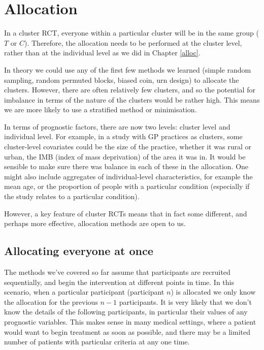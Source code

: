\documentclass[
  openany]{book}
\theoremstyle{definition}
\theoremstyle{definition}
\theoremstyle{definition}
\theoremstyle{definition}
\theoremstyle{remark}
\begin{document}
\hypertarget{allocation}{%
\section{Allocation}\label{allocation}}

In a cluster RCT, everyone within a particular cluster will be in the same group (\(T\) or \(C\)). Therefore, the allocation needs to be performed at the cluster level, rather than at the individual level as we did in Chapter \ref{alloc}.

In theory we could use any of the first few methods we learned (simple random sampling, random permuted blocks, biased coin, urn design) to allocate the clusters. However, there are often relatively few clusters, and so the potential for imbalance in terms of the nature of the clusters would be rather high. This means we are more likely to use a stratified method or minimisation.

In terms of prognostic factors, there are now two levels: cluster level and individual level. For example, in a study with GP practices as clusters, some cluster-level covariates could be the size of the practice, whether it was rural or urban, the IMB (index of mass deprivation) of the area it was in. It would be sensible to make sure there was balance in each of these in the allocation. One might also include aggregates of individual-level characteristics, for example the mean age, or the proportion of people with a particular condition (especially if the study relates to a particular condition).

However, a key feature of cluster RCTs means that in fact some different, and perhaps more effective, allocation methods are open to us.

\hypertarget{allocating-everyone-at-once}{%
\subsection{Allocating everyone at once}\label{allocating-everyone-at-once}}

The methods we've covered so far assume that participants are recruited sequentially, and begin the intervention at different points in time. In this scenario, when a particular participant (participant \(n\)) is allocated we only know the allocation for the previous \(n-1\) participants. It is very likely that we don't know the details of the following participants, in particular their values of any prognostic variables. This makes sense in many medical settings, where a patient would want to begin treatment as soon as possible, and there may be a limited number of patients with particular criteria at any one time.
\end{document}
